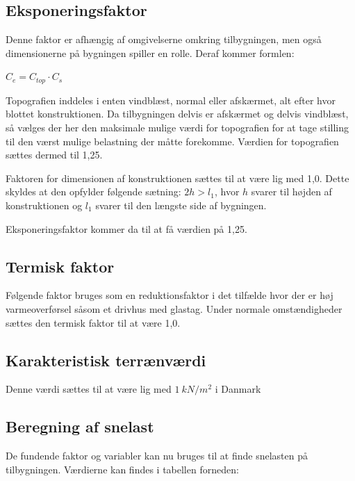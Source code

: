 \subsection{Eksponeringsfaktor}
Denne faktor er afhængig af omgivelserne omkring tilbygningen, men også dimensionerne på bygningen spiller en rolle. Deraf kommer formlen:

$C_e = C_{top} \cdot  C_s$

Topografien inddeles i enten vindblæst, normal eller afskærmet, alt efter hvor blottet konstruktionen. Da tilbygningen delvis er afskærmet og delvis vindblæst, så vælges der her den maksimale mulige værdi for topografien for at tage stilling til den værst mulige belastning der måtte forekomme. Værdien for topografien sættes dermed til 1,25.

Faktoren for dimensionen af konstruktionen sættes til at være lig med 1,0. Dette skyldes at den opfylder følgende sætning: $2h > l_1$, hvor $h$ svarer til højden af konstruktionen og $l_1$ svarer til den længste side af bygningen.

Eksponeringsfaktor kommer da til at få værdien på 1,25.

\subsection{Termisk faktor}
Følgende faktor bruges som en reduktionsfaktor i det tilfælde hvor der er høj varmeoverførsel såsom et drivhus med glastag. Under normale omstændigheder sættes den termisk faktor til at være 1,0.

\subsection{Karakteristisk terrænværdi}
Denne værdi sættes til at være lig med $\SI{1}{ kN/m^2}$ i Danmark

\subsection{Beregning af snelast}
De fundende faktor og variabler kan nu bruges til at finde snelasten på tilbygningen. Værdierne kan findes i tabellen forneden:

